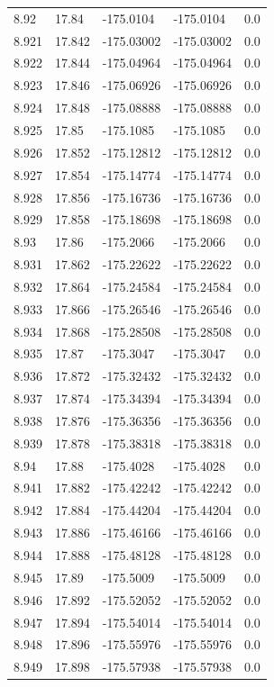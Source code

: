 \begin{tabular}{lllll}
8.92 & 17.84 & -175.0104 & -175.0104 & 0.0 \\
8.921 & 17.842 & -175.03002 & -175.03002 & 0.0 \\
8.922 & 17.844 & -175.04964 & -175.04964 & 0.0 \\
8.923 & 17.846 & -175.06926 & -175.06926 & 0.0 \\
8.924 & 17.848 & -175.08888 & -175.08888 & 0.0 \\
8.925 & 17.85 & -175.1085 & -175.1085 & 0.0 \\
8.926 & 17.852 & -175.12812 & -175.12812 & 0.0 \\
8.927 & 17.854 & -175.14774 & -175.14774 & 0.0 \\
8.928 & 17.856 & -175.16736 & -175.16736 & 0.0 \\
8.929 & 17.858 & -175.18698 & -175.18698 & 0.0 \\
8.93 & 17.86 & -175.2066 & -175.2066 & 0.0 \\
8.931 & 17.862 & -175.22622 & -175.22622 & 0.0 \\
8.932 & 17.864 & -175.24584 & -175.24584 & 0.0 \\
8.933 & 17.866 & -175.26546 & -175.26546 & 0.0 \\
8.934 & 17.868 & -175.28508 & -175.28508 & 0.0 \\
8.935 & 17.87 & -175.3047 & -175.3047 & 0.0 \\
8.936 & 17.872 & -175.32432 & -175.32432 & 0.0 \\
8.937 & 17.874 & -175.34394 & -175.34394 & 0.0 \\
8.938 & 17.876 & -175.36356 & -175.36356 & 0.0 \\
8.939 & 17.878 & -175.38318 & -175.38318 & 0.0 \\
8.94 & 17.88 & -175.4028 & -175.4028 & 0.0 \\
8.941 & 17.882 & -175.42242 & -175.42242 & 0.0 \\
8.942 & 17.884 & -175.44204 & -175.44204 & 0.0 \\
8.943 & 17.886 & -175.46166 & -175.46166 & 0.0 \\
8.944 & 17.888 & -175.48128 & -175.48128 & 0.0 \\
8.945 & 17.89 & -175.5009 & -175.5009 & 0.0 \\
8.946 & 17.892 & -175.52052 & -175.52052 & 0.0 \\
8.947 & 17.894 & -175.54014 & -175.54014 & 0.0 \\
8.948 & 17.896 & -175.55976 & -175.55976 & 0.0 \\
8.949 & 17.898 & -175.57938 & -175.57938 & 0.0 \\

\end{tabular}
